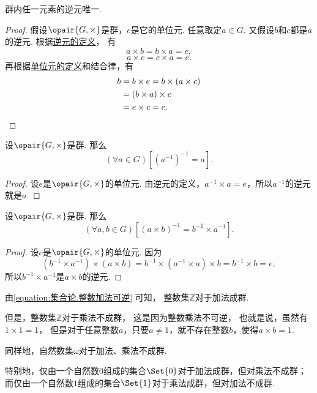 \begin{theorem}\label{theorem:抽象代数.群内任一元的逆元唯一}
群内任一元素的逆元唯一.
\begin{proof}
假设\(\opair{G,\times}\)是群，\(e\)是它的单位元.
任意取定\(a \in G\).
又假设\(b\)和\(c\)都是\(a\)的逆元.
根据\hyperref[definition:抽象代数.群的定义]{逆元的定义}，
有\[
    a \times b = b \times a = e,
\]\[
    a \times c = c \times a = e.
\]
再根据\hyperref[definition:抽象代数.幺半群的定义]{单位元的定义}和结合律，有\begin{align*}
    b &= b \times e
	= b \times (a \times c) \\
    &= (b \times a) \times c \\
    &= e \times c
	= c.
	\qedhere
\end{align*}
\end{proof}
\end{theorem}

\begin{theorem}\label{theorem:抽象代数.群内任一元的逆的逆是它本身}
设\(\opair{G,\times}\)是群.
那么\[
	(\forall a\in G)[(a^{-1})^{-1}=a].
\]
\begin{proof}
设\(e\)是\(\opair{G,\times}\)的单位元.
由逆元的定义，\(a^{-1} \times a = e\)，所以\(a^{-1}\)的逆元就是\(a\).
\end{proof}
\end{theorem}

\begin{theorem}\label{theorem:抽象代数.群内元素的乘积的逆}
设\(\opair{G,\times}\)是群.
那么\[
	(\forall a,b\in G)[
		(a \times b)^{-1}
		= b^{-1} \times a^{-1}
	].
\]
\begin{proof}
设\(e\)是\(\opair{G,\times}\)的单位元.
因为\[
	(b^{-1} \times a^{-1})\times(a \times b)
	= b^{-1} \times (a^{-1} \times a) \times b
	= b^{-1} \times b
	= e,
\]
所以\(b^{-1} \times a^{-1}\)是\(a \times b\)的逆元.
\end{proof}
\end{theorem}

由\cref{equation:集合论.整数加法可逆} 可知，
整数集\(\mathbb{Z}\)对于加法成群.

但是，整数集\(\mathbb{Z}\)对于乘法不成群，
这是因为整数乘法不可逆，
也就是说，虽然有\(1\times1=1\)，
但是对于任意整数\(a\)，只要\(a\neq1\)，就不存在整数\(b\)，使得\(a \times b = 1\).

同样地，自然数集\(\omega\)对于加法、乘法不成群.

特别地，仅由一个自然数\(0\)组成的集合\(\Set{0}\)对于加法成群，但对乘法不成群；
而仅由一个自然数\(1\)组成的集合\(\Set{1}\)对于乘法成群，但对加法不成群.

